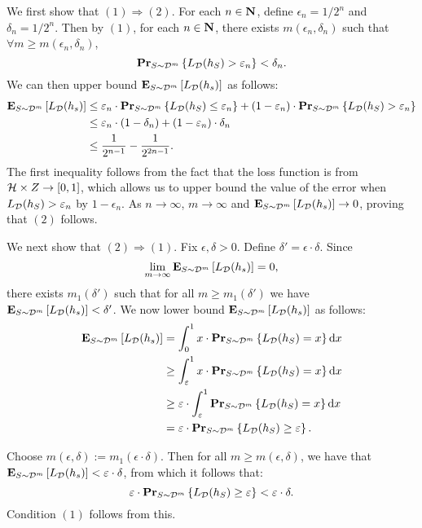 We first show that $(1) \Rightarrow (2)$. For each $n \in \mathbf{N}$, define
$\epsilon_n = 1 / 2^n$ and $\delta_n = 1 / 2^n$. Then by $(1)$, for each
$n \in \mathbf{N}$, there exists $m(\epsilon_n, \delta_n)$ such that
$\forall m \geq m(\epsilon_n, \delta_n)$,
\[
    \mathbf{Pr}_{S \sim \mathcal{D}^{m}} \left \{ L_{\mathcal{D}} (h_S) > \varepsilon_n \right \} < \delta_n.
\]
We can then upper bound $\mathbf{E}_{S \sim \mathcal{D}^m} \left [ L_{\mathcal{D}}(h_s) \right ]$ as follows:
\begin{align*}
\mathbf{E}_{S \sim \mathcal{D}^m} \left [ L_{\mathcal{D}} (h_s) \right ]
& \leq \varepsilon_n \cdot  \mathbf{Pr}_{S \sim \mathcal{D}^{m}} \left \{ L_{\mathcal{D}} (h_S) \leq \varepsilon_n \right \} +
    (1 - \varepsilon_n) \cdot  \mathbf{Pr}_{S \sim \mathcal{D}^{m}} \left \{ L_{\mathcal{D}} (h_S) > \varepsilon_n \right \} \\
& \leq \varepsilon_n \cdot (1 - \delta_n) + (1 - \varepsilon_n) \cdot \delta_n \\
& \leq \frac{1}{2^{n - 1}} - \frac{1}{2^{2n - 1}}.
\end{align*}
The first inequality follows from the fact that the loss function is from
$\mathcal{H} \times Z \rightarrow [0, 1]$, which allows us to upper bound the value of the error
when $L_{\mathcal{D}} (h_S) > \varepsilon_n$ by $1 - \epsilon_n$. As $n \to \infty$, $m \to \infty$
and $\mathbf{E}_{S \sim \mathcal{D}^m} \left [ L_{\mathcal{D}} (h_s) \right ] \to 0$, proving that $(2)$ follows.

We next show that $(2) \Rightarrow (1)$. Fix $\epsilon, \delta > 0$. Define
$\delta' = \epsilon \cdot \delta$. Since
$$\lim_{m \to \infty} \mathbf{E}_{S \sim \mathcal{D}^m} \left [ L_{\mathcal{D}}(h_s) \right ] = 0,$$
there exists $m_1(\delta')$ such that for all $m
\geq m_1(\delta')$ we have $\mathbf{E}_{S \sim \mathcal{D}^m} \left [ L_{\mathcal{D}}(h_s) \right ] < \delta'$.
We now lower bound $\mathbf{E}_{S \sim \mathcal{D}^m} \left [ L_{\mathcal{D}}(h_s) \right ]$ as follows:
\begin{align*}
\mathbf{E}_{S \sim \mathcal{D}^m} \left [ L_{\mathcal{D}}(h_s) \right ]
& = \int_{0}^{1} x \cdot  \mathbf{Pr}_{S \sim \mathcal{D}^{m}} \left \{ L_{\mathcal{D}} (h_S) = x \right \} \text{d} x \\
& \geq \int_{\varepsilon}^1 x \cdot  \mathbf{Pr}_{S \sim \mathcal{D}^{m}} \left \{ L_{\mathcal{D}} (h_S) = x \right \} \text{d} x \\
& \geq \varepsilon \cdot \int_{\varepsilon}^1 \mathbf{Pr}_{S \sim \mathcal{D}^{m}} \left \{ L_{\mathcal{D}} (h_S) = x \right \} \text{d} x \\
& = \varepsilon \cdot  \mathbf{Pr}_{S \sim \mathcal{D}^{m}} \left \{ L_{\mathcal{D}} (h_S) \geq \varepsilon \right \}.
\end{align*}

Choose $m(\epsilon, \delta) := m_1(\epsilon \cdot \delta)$. Then for all $m
\geq m(\epsilon, \delta)$, we have that $\mathbf{E}_{S \sim
\mathcal{D}^m} \left [ L_{\mathcal{D}}(h_s) \right ] < \varepsilon \cdot \delta$, from which it follows that:
\[
    \varepsilon \cdot  \mathbf{Pr}_{S \sim \mathcal{D}^{m}} \left \{ L_{\mathcal{D}} (h_S) \geq \varepsilon \right \} <
        \varepsilon \cdot \delta. \]
Condition $(1)$ follows from this.
